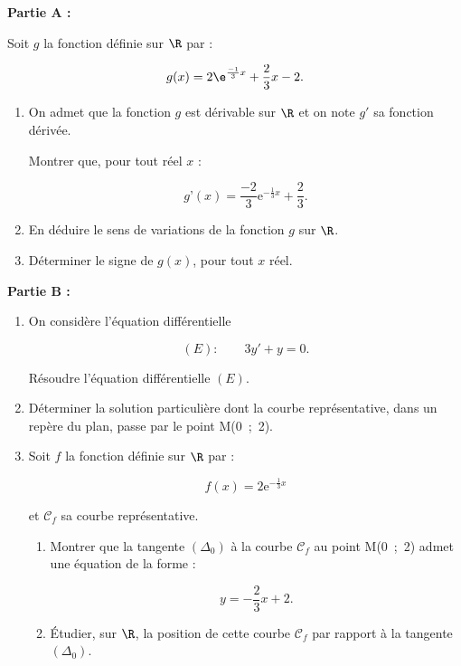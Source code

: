 
\bigskip 

\textbf{Partie A :}

\medskip

Soit $g$ la fonction définie sur $\R$ par :

\[g(x) = 2\e^{\frac{-1}{3}x} + \dfrac{2}{3}x - 2.\]

\smallskip

\begin{enumerate}
\item On admet que la fonction $g$ est dérivable sur $\R$ et on note $g'$ sa fonction dérivée.

Montrer que, pour tout réel $x$ :

\[g’(x) = \dfrac{-2}{3}\text{e}^{- \frac{1}{3}x} + \dfrac{2}{3}.\]

\item En déduire le sens de variations de la fonction $g$ sur $\R$.
\item Déterminer le signe de $g(x)$, pour tout $x$ réel.
\end{enumerate}

\bigskip

\textbf{Partie B :}

\medskip

\begin{enumerate}
\item On considère l'équation différentielle

\[(E) :\qquad  3y' + y = 0.\]

Résoudre l'équation différentielle $(E)$.
\item Déterminer la solution particulière dont la courbe représentative, dans un repère du plan, passe par le point M(0~;~2).
\item Soit $f$ la fonction définie sur $\R$ par :

\[f(x) = 2\text{e}^{- \frac{1}{3}x}\]

et $\mathcal{C}_f$ sa courbe représentative.
	\begin{enumerate}
		\item Montrer que la tangente $\left(\Delta_0\right)$ à la courbe $\mathcal{C}_f$ au point M(0~;~2) admet une équation de la forme :

\[y= - \dfrac{2}{3}x + 2.\]

		\item Étudier, sur $\R$, la position de cette courbe 
$\mathcal{C}_f$ par rapport à la tangente
$\left(\Delta_0\right)$.
	\end{enumerate}
\end{enumerate}

